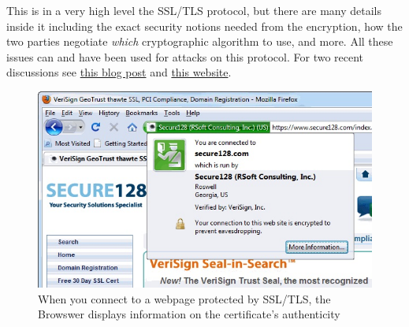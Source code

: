 This is in a very high level the SSL/TLS protocol, but there are many
details inside it including the exact security notions needed from the
encryption, how the two parties negotiate \emph{which} cryptographic
algorithm to use, and more. All these issues can and have been used for
attacks on this protocol. For two recent discussions see
\href{http://blog.cryptographyengineering.com/2013/12/how-does-nsa-break-ssl.html}{this
blog post} and \href{https://weakdh.org/}{this website}.


\begin{figure}
\centering
\includegraphics[width=\textwidth, height=0.25\paperheight, keepaspectratio]{../figure/certificate.jpg}
\caption{When you connect to a webpage protected by SSL/TLS, the
Browswer displays information on the certificate's authenticity}
\label{tmplabelfig}
\end{figure}


